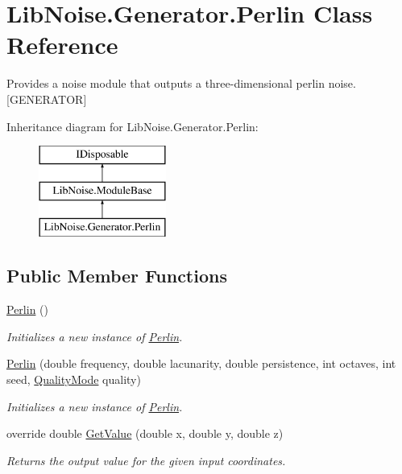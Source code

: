 \hypertarget{class_lib_noise_1_1_generator_1_1_perlin}{}\section{Lib\+Noise.\+Generator.\+Perlin Class Reference}
\label{class_lib_noise_1_1_generator_1_1_perlin}


Provides a noise module that outputs a three-\/dimensional perlin noise. \mbox{[}G\+E\+N\+E\+R\+A\+T\+OR\mbox{]}  


Inheritance diagram for Lib\+Noise.\+Generator.\+Perlin\+:\begin{figure}[H]
\begin{center}
\leavevmode
\includegraphics[height=3.000000cm]{class_lib_noise_1_1_generator_1_1_perlin}
\end{center}
\end{figure}
\subsection*{Public Member Functions}
\begin{DoxyCompactItemize}
\item 
\hyperlink{class_lib_noise_1_1_generator_1_1_perlin_a3602fdceebc6f930056880627e7c013e}{Perlin} ()
\begin{DoxyCompactList}\small\item\em Initializes a new instance of \hyperlink{class_lib_noise_1_1_generator_1_1_perlin}{Perlin}. \end{DoxyCompactList}\item 
\hyperlink{class_lib_noise_1_1_generator_1_1_perlin_a0495e8f6b923ad4edd734a477594827e}{Perlin} (double frequency, double lacunarity, double persistence, int octaves, int seed, \hyperlink{namespace_lib_noise_ab253d2180e71b8b4b51e250163ca0e27}{Quality\+Mode} quality)
\begin{DoxyCompactList}\small\item\em Initializes a new instance of \hyperlink{class_lib_noise_1_1_generator_1_1_perlin}{Perlin}. \end{DoxyCompactList}\item 
override double \hyperlink{class_lib_noise_1_1_generator_1_1_perlin_ad665421f8002cebae781765259a1152d}{Get\+Value} (double x, double y, double z)
\begin{DoxyCompactList}\small\item\em Returns the output value for the given input coordinates. \end{DoxyCompactList}\end{DoxyCompactItemize}
